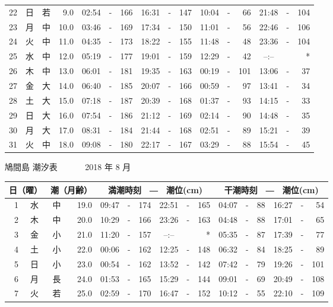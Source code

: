\documentclass[12pt.a4j]{jsarticle}
\begin{document}
\begin{center}
\begin{table}[ht]
\begin{tabular}{|rc|cr|ccrccr|ccrccr|}
22 & 日 & 若 &  9.0 & 02:54 &-& 166 & 16:31 &-& 147 & 10:04 &-&  66 & 21:48 &-& 104 \\
23 & 月 & 中 & 10.0 & 03:46 &-& 169 & 17:34 &-& 150 & 11:01 &-&  56 & 22:46 &-& 106 \\
24 & 火 & 中 & 11.0 & 04:35 &-& 173 & 18:22 &-& 155 & 11:48 &-&  48 & 23:36 &-& 104 \\
25 & 水 & 中 & 12.0 & 05:19 &-& 177 & 19:01 &-& 159 & 12:29 &-&  42 & --:-- & &  *  \\
26 & 木 & 中 & 13.0 & 06:01 &-& 181 & 19:35 &-& 163 & 00:19 &-& 101 & 13:06 &-&  37 \\
27 & 金 & 大 & 14.0 & 06:40 &-& 185 & 20:07 &-& 166 & 00:59 &-&  97 & 13:41 &-&  34 \\
28 & 土 & 大 & 15.0 & 07:18 &-& 187 & 20:39 &-& 168 & 01:37 &-&  93 & 14:15 &-&  33 \\
29 & 日 & 大 & 16.0 & 07:54 &-& 186 & 21:12 &-& 169 & 02:14 &-&  90 & 14:48 &-&  35 \\
30 & 月 & 大 & 17.0 & 08:31 &-& 184 & 21:44 &-& 168 & 02:51 &-&  89 & 15:21 &-&  39 \\
31 & 火 & 中 & 18.0 & 09:08 &-& 180 & 22:17 &-& 167 & 03:29 &-&  88 & 15:54 &-&  45 \\
\hline
\end{tabular}
\end{table}
\newpage
{\LARGE 鳩間島  潮汐表　　　}
{\large 2018 年  8 月}\\
\begin{table}[ht]
\begin{tabular}{|rc|cr|ccrccr|ccrccr|}
\hline
\multicolumn{2}{|c|}{日（曜）} & \multicolumn{2}{c|}{潮（月齢）} & \multicolumn{6}{c|}{満潮時刻　―　潮位(cm)} & \multicolumn{6}{c|}{干潮時刻　―　潮位(cm)} \\
\hline
 1 & 水 & 中 & 19.0 & 09:47 &-& 174 & 22:51 &-& 165 & 04:07 &-&  88 & 16:27 &-&  54 \\
 2 & 木 & 中 & 20.0 & 10:29 &-& 166 & 23:26 &-& 163 & 04:48 &-&  88 & 17:01 &-&  65 \\
 3 & 金 & 小 & 21.0 & 11:20 &-& 157 & --:-- & &  *  & 05:35 &-&  87 & 17:39 &-&  77 \\
 4 & 土 & 小 & 22.0 & 00:06 &-& 162 & 12:25 &-& 148 & 06:32 &-&  84 & 18:25 &-&  89 \\
 5 & 日 & 小 & 23.0 & 00:54 &-& 162 & 13:52 &-& 142 & 07:42 &-&  79 & 19:26 &-& 101 \\
 6 & 月 & 長 & 24.0 & 01:53 &-& 165 & 15:29 &-& 144 & 09:01 &-&  69 & 20:49 &-& 108 \\
 7 & 火 & 若 & 25.0 & 02:59 &-& 170 & 16:47 &-& 152 & 10:12 &-&  55 & 22:10 &-& 109 \\

\end{tabular}
\end{table}
\end{center}
\end{document}
